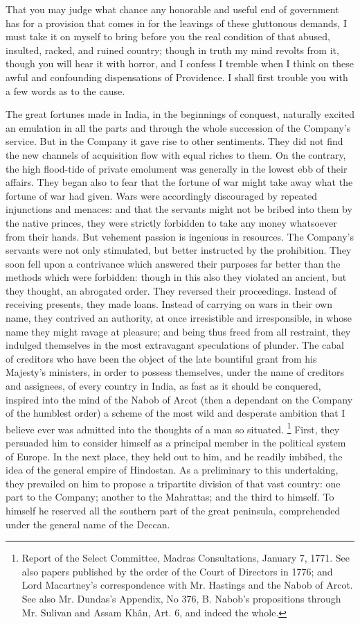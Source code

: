That you may judge what chance any honorable and useful end of government has for a provision that comes in for the leavings of these gluttonous demands, I must take it on myself to bring before you the real condition of that abused, insulted, racked, and ruined country; though in truth my mind revolts from it, though you will hear it with horror, and I confess I tremble when I think on these awful and confounding dispensations of Providence. I shall first trouble you with a few words as to the cause.

The great fortunes made in India, in the beginnings of conquest, naturally excited an emulation in all the parts and through the whole succession of the Company's service. But in the Company it gave rise to other sentiments. They did not find the new channels of acquisition flow with equal riches to them. On the contrary, the high flood-tide of private emolument was generally in the lowest ebb of their affairs. They began also to fear that the fortune of war might take away what the fortune of war had given. Wars were accordingly discouraged by repeated injunctions and menaces: and that the servants might not be bribed into them by the native princes, they were strictly forbidden to take any money whatsoever from their hands. But vehement passion is ingenious in resources. The Company's servants were not only stimulated, but better instructed by the prohibition. They soon fell upon a contrivance which answered their purposes far better than the methods which were forbidden: though in this also they violated an ancient, but they thought, an abrogated order. They reversed their proceedings. Instead of receiving presents, they made loans. Instead of carrying on wars in their own name, they contrived an authority, at once irresistible and irresponsible, in whose name they might ravage at pleasure; and being thus freed from all restraint, they indulged themselves in the most extravagant speculations of plunder. The cabal of creditors who have been the object of the late bountiful grant from his Majesty's ministers, in order to possess themselves, under the name of creditors and assignees, of every country in India, as fast as it should be conquered, inspired into the mind of the Nabob of Arcot (then a dependant on the Company of the humblest order) a scheme of the most wild and desperate ambition that I believe ever was admitted into the thoughts of a man so situated.
\footnote{ Report of the Select Committee, Madras Consultations, January 7, 1771. See also papers published by the order of the Court of Directors in 1776; and Lord Macartney's correspondence with Mr. Hastings and the Nabob of Arcot. See also Mr. Dundas's Appendix, No 376, B. Nabob's propositions through Mr. Sulivan and Assam Khân, Art. 6, and indeed the whole.}
 First, they persuaded him to consider himself as a principal member in the political system of Europe. In the next place, they held out to him, and he readily imbibed, the idea of the general empire of Hindostan. As a preliminary to this undertaking, they prevailed on him to propose a tripartite division of that vast country: one part to the Company; another to the Mahrattas; and the third to himself. To himself he reserved all the southern part of the great peninsula, comprehended under the general name of the Deccan.

